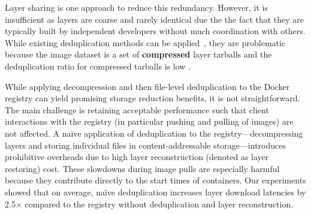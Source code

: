 Layer sharing is one approach to reduce this redundancy.
%
However, it is insufficient as layers are coarse and rarely identical due the the
fact that they are typically built by independent developers without much coordination
with others.
%
While existing deduplication methods can be applied~\cite{dedup1,dedup2,dedup3}, they
are problematic because 
the image dataset is a set of \textbf{compressed} layer tarballs
and the deduplication ratio for compressed tarballs is low .


While applying decompression and then file-level deduplication to the Docker registry 
can yield promising storage
reduction benefits, it is not straightforward.
%
The main challenge is retaining acceptable performance such that client
interactions with the registry (in particular pushing and pulling of images)
are not affected.
%
A na\"{i}ve application of deduplication to the registry---decompressing
layers and storing individual files in content-addressable storage---introduces
prohibitive overheads due to high layer reconstruction 
(denoted as layer restoring) cost.
%
These slowdowns during image pulls are especially
harmful because they contribute directly to the start times of containers.
%
Our experiments showed that on average, na\"{i}ve deduplication increases layer
download latencies by 2.5$\times$ compared to the registry without deduplication and layer reconstruction.

